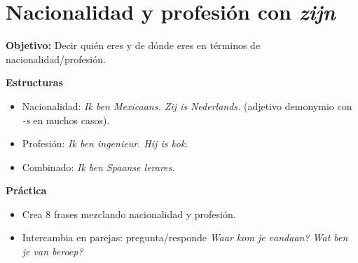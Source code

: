 \section{Nacionalidad y profesión con \textit{zijn}}
\textbf{Objetivo:} Decir quién eres y de dónde eres en términos de nacionalidad/profesión.

\textbf{Estructuras}
\begin{itemize}[leftmargin=*]
  \item Nacionalidad: \textit{Ik ben Mexicaans. Zij is Nederlands.} (adjetivo demonymio con \textit{-s} en muchos casos).
  \item Profesión: \textit{Ik ben ingenieur. Hij is kok.}
  \item Combinado: \textit{Ik ben Spaanse lerares.}
\end{itemize}

\textbf{Práctica}
\begin{itemize}[leftmargin=*]
  \item Crea 8 frases mezclando nacionalidad y profesión.
  \item Intercambia en parejas: pregunta/responde \textit{Waar kom je vandaan? Wat ben je van beroep?}
\end{itemize}
